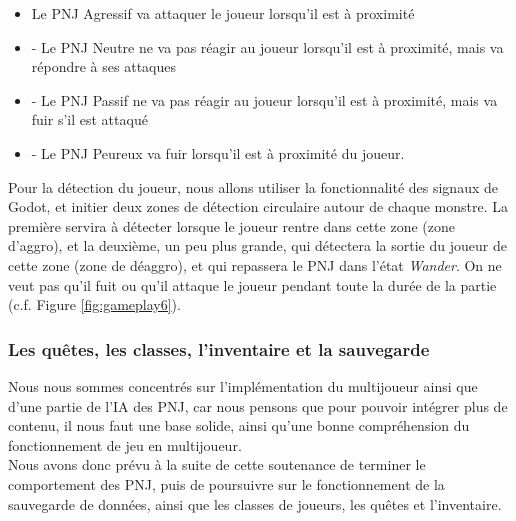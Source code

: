 \begin{itemize}

    \item Le PNJ Agressif va attaquer le joueur lorsqu'il est à proximité
          \\

    \item - Le PNJ Neutre ne va pas réagir au joueur lorsqu'il est à proximité, mais va répondre à ses attaques
          \\

    \item - Le PNJ Passif ne va pas réagir au joueur lorsqu'il est à proximité, mais va fuir s'il est attaqué
          \\

    \item - Le PNJ Peureux va fuir lorsqu'il est à proximité du joueur.
          \\

\end{itemize}

Pour la détection du joueur, nous allons utiliser la fonctionnalité des signaux de Godot, et initier deux zones de détection circulaire autour de chaque monstre.
La première servira à détecter lorsque le joueur rentre dans cette zone (zone d'aggro), et la deuxième, un peu plus grande, qui détectera la sortie du joueur de cette zone (zone de déaggro), et qui repassera le PNJ dans l'état \textit{Wander}.
On ne veut pas qu'il fuit ou qu'il attaque le joueur pendant toute la durée de la partie (c.f. Figure \ref*{fig:gameplay6}).

\subsubsection*{Les quêtes, les classes, l'inventaire et la sauvegarde}

Nous nous sommes concentrés sur l'implémentation du multijoueur ainsi que d'une partie de l'IA des PNJ, car nous pensons que pour pouvoir intégrer plus de contenu, il nous faut une base solide, ainsi qu'une bonne compréhension du fonctionnement de jeu en multijoueur.
\\

Nous avons donc prévu à la suite de cette soutenance de terminer le comportement des PNJ, puis de poursuivre sur le fonctionnement de la sauvegarde de données, ainsi que les classes de joueurs, les quêtes et l'inventaire.

